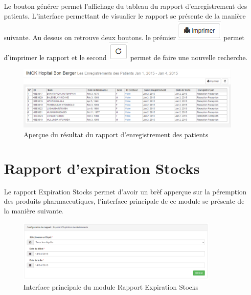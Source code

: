 \documentclass[12pt,a4paper]{report}
\begin{document}
Le bouton générer permet l'affichage du tableau du rapport d'enregistrement des patients. L'interface permettant de visualier le rapport se présente de la manière suivante. Au dessus on retrouve deux boutons. le prémier 
\includegraphics[scale=0.7]{pic/Print.png} permet d'imprimer le rapport et le second \includegraphics[scale=0.7]{pic/refresh.png} permet de faire une nouvelle recherche.


\begin{figure}[h]
\begin{center}
\includegraphics[width=12cm]{pic/PatientSaving.png}
\end{center}
\caption{Aperçue du résultat du rapport d'enregistrement des patients}
\label{Aperçue du résultat du rapport d'enregistrement des patients}
\end{figure}

\newpage
\section{Rapport d'expiration Stocks}
Le rapport Expiration Stocks permet d'avoir un brèf apperçue sur la péremption des produits pharmaceutiques, l'interface principale de ce module se présente de la manière suivante.

\begin{figure}[h]
\begin{center}
\includegraphics[width=10cm]{pic/RappExMedi.png}
\end{center}
\caption{Interface principale du module Rapport Expiration Stocks}
\label{Interface principale du module Rapport Expiration Stocks}
\end{figure}
\end{document}
